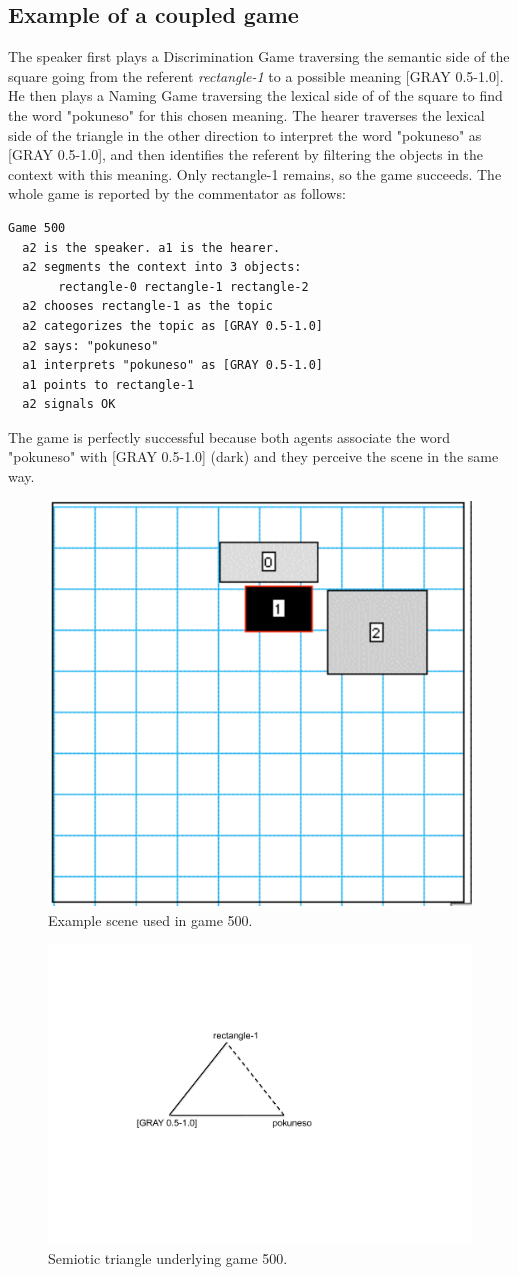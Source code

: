 \subsection{Example of a coupled game}

The speaker first plays a Discrimination Game traversing the 
semantic side of the square going from the referent 
{\itshape rectangle-1} to a possible meaning [GRAY 0.5-1.0]. 
He then plays a Naming Game traversing the lexical side of 
of the square to find the word "pokuneso" for this chosen meaning. 
The hearer traverses the lexical side of the triangle in 
the other direction to interpret the word "pokuneso" as
{}[GRAY 0.5-1.0], and then identifies the referent by 
filtering the objects in the context with this meaning. 
Only rectangle-1 remains, so the game succeeds. 
The whole game is reported by the commentator as follows: 
\begin{verbatim}
Game 500
  a2 is the speaker. a1 is the hearer. 
  a2 segments the context into 3 objects: 
       rectangle-0 rectangle-1 rectangle-2
  a2 chooses rectangle-1 as the topic 
  a2 categorizes the topic as [GRAY 0.5-1.0]
  a2 says: "pokuneso"
  a1 interprets "pokuneso" as [GRAY 0.5-1.0]
  a1 points to rectangle-1
  a2 signals OK 
\end{verbatim}
The game is perfectly successful because both 
agents associate the word "pokuneso" with 
{}[GRAY 0.5-1.0] (dark) and they perceive the scene 
in the same way.
\begin{figure}[htbp]
  \centerline{\includegraphics[width=.40\textwidth]{chap6/figs/recscene}}
\caption{\label{rect1} Example scene used
in game 500.}
\end{figure}

\begin{figure}[htbp]
  \centerline{\includegraphics[width=.45\textwidth]{chap6/figs/triangle2}}
\caption{\label{triangle2} Semiotic triangle 
underlying game 500.}
\end{figure}

